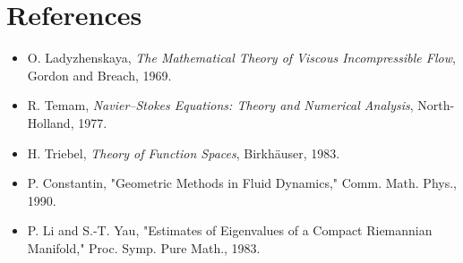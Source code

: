 \documentclass[12pt]{article}
\theoremstyle{definition}
\begin{document}
\section*{References}
\begin{itemize}
    \item O. Ladyzhenskaya, \emph{The Mathematical Theory of Viscous Incompressible Flow}, Gordon and Breach, 1969.
    \item R. Temam, \emph{Navier--Stokes Equations: Theory and Numerical Analysis}, North-Holland, 1977.
    \item H. Triebel, \emph{Theory of Function Spaces}, Birkh\"auser, 1983.
    \item P. Constantin, "Geometric Methods in Fluid Dynamics," Comm. Math. Phys., 1990.
    \item P. Li and S.-T. Yau, "Estimates of Eigenvalues of a Compact Riemannian Manifold," Proc. Symp. Pure Math., 1983.
\end{itemize}
\end{document}

